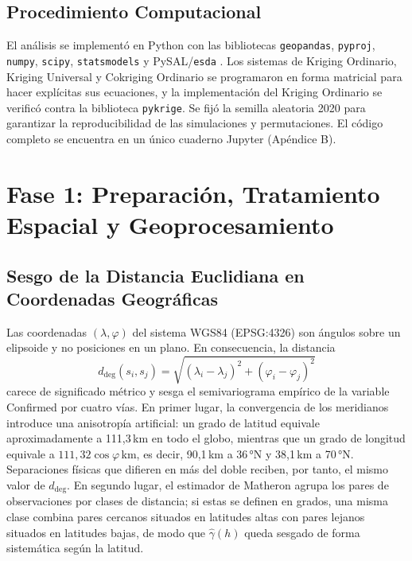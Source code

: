 \documentclass[12pt,a4paper]{article}
\begin{document}
\subsection{Procedimiento Computacional}

El análisis se implementó en Python con las bibliotecas \texttt{geopandas}, \texttt{pyproj}, \texttt{numpy}, \texttt{scipy}, \texttt{statsmodels} y PySAL/\texttt{esda} \citep{rey2007}. Los sistemas de Kriging Ordinario, Kriging Universal y Cokriging Ordinario se programaron en forma matricial para hacer explícitas sus ecuaciones, y la implementación del Kriging Ordinario se verificó contra la biblioteca \texttt{pykrige}. Se fijó la semilla aleatoria 2020 para garantizar la reproducibilidad de las simulaciones y permutaciones. El código completo se encuentra en un único cuaderno Jupyter (Apéndice B).

\section{Fase 1: Preparación, Tratamiento Espacial y Geoprocesamiento}

\subsection{Sesgo de la Distancia Euclidiana en Coordenadas Geográficas}

Las coordenadas $(\lambda,\varphi)$ del sistema WGS84 (EPSG:4326) son ángulos sobre un elipsoide y no posiciones en un plano. En consecuencia, la distancia
\[
d_{\deg}(s_i,s_j)=\sqrt{(\lambda_i-\lambda_j)^2+(\varphi_i-\varphi_j)^2}
\]
carece de significado métrico y sesga el semivariograma empírico de la variable Confirmed por cuatro vías. En primer lugar, la convergencia de los meridianos introduce una anisotropía artificial: un grado de latitud equivale aproximadamente a 111,3\,km en todo el globo, mientras que un grado de longitud equivale a $111{,}32\cos\varphi$\,km, es decir, 90,1\,km a 36\,°N y 38,1\,km a 70\,°N. Separaciones físicas que difieren en más del doble reciben, por tanto, el mismo valor de $d_{\deg}$. En segundo lugar, el estimador de Matheron agrupa los pares de observaciones por clases de distancia; si estas se definen en grados, una misma clase combina pares cercanos situados en latitudes altas con pares lejanos situados en latitudes bajas, de modo que $\hat\gamma(h)$ queda sesgado de forma sistemática según la latitud.
\end{document}
